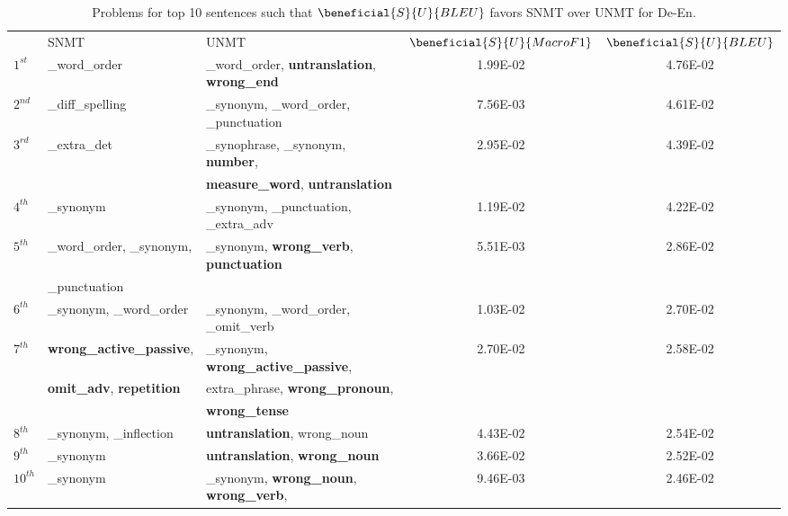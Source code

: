 \begin{table*}[t]
    \centering
    \footnotesize
    \begin{tabular}{ l l l c c }
    
       & SNMT & UNMT & $\beneficial{S}{U}{MacroF1}$ & $\beneficial{S}{U}{BLEU}$ \\ 
$1^{st}$ & \_word\_order    &	\_word\_order, \textbf{untranslation}, \textbf{wrong\_end} & 1.99E-02 & 4.76E-02 \\
$2^{nd}$ & \_diff\_spelling &	\_synonym, \_word\_order, \_punctuation&7.56E-03& 4.61E-02 \\
$3^{rd}$ & \_extra\_det     &	\_synophrase, \_synonym, \textbf{number}, &2.95E-02& 4.39E-02 \\
       &               &\textbf{measure\_word}, \textbf{untranslation} & \\
$4^{th}$ & \_synonym&	\_synonym, \_punctuation, \_extra\_adv&1.19E-02& 4.22E-02\\
$5^{th}$ & \_word\_order, \_synonym, &	\_synonym, \textbf{wrong\_verb}, \textbf{punctuation}&5.51E-03& 2.86E-02\\
& \_punctuation&&\\
$6^{th}$ & \_synonym, \_word\_order&	\_synonym, \_word\_order, \_omit\_verb&1.03E-02& 2.70E-02\\
$7^{th}$ & \textbf{wrong\_active\_passive}, &	\_synonym, \textbf{wrong\_active\_passive}, &2.70E-02&2.58E-02\\
& \textbf{omit\_adv}, \textbf{repetition}&extra\_phrase, \textbf{wrong\_pronoun}, &\\
& & \textbf{wrong\_tense} & \\
$8^{th}$ & \_synonym, \_inflection&	\textbf{untranslation}, wrong\_noun&4.43E-02& 2.54E-02\\
$9^{th}$ & \_synonym &	\textbf{untranslation}, \textbf{wrong\_noun}&3.66E-02& 2.52E-02\\
$10^{th}$ & \_synonym&	\_synonym, \textbf{wrong\_noun}, \textbf{wrong\_verb}, &9.46E-03& 2.46E-02\\

    \end{tabular}%
    \caption{Problems for top 10 sentences such that $\beneficial{S}{U}{BLEU}$ favors SNMT over UNMT for De-En. }
    \label{tab:snmt_better_bleu}
\end{table*}


